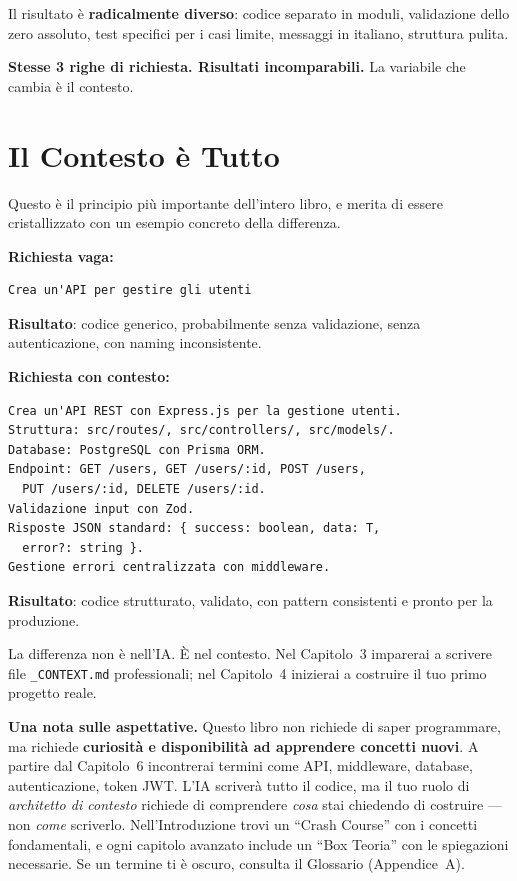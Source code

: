 Il risultato è \textbf{radicalmente diverso}: codice separato in moduli, validazione dello zero assoluto, test specifici per i casi limite, messaggi in italiano, struttura pulita.

\textbf{Stesse 3 righe di richiesta. Risultati incomparabili.} La variabile che cambia è il contesto.

\section{Il Contesto è Tutto}

Questo è il principio più importante dell'intero libro, e merita di essere cristallizzato con un esempio concreto della differenza.

\textbf{Richiesta vaga:}
\begin{lstlisting}
Crea un'API per gestire gli utenti
\end{lstlisting}
\textbf{Risultato}: codice generico, probabilmente senza validazione, senza autenticazione, con naming inconsistente.

\textbf{Richiesta con contesto:}
\begin{lstlisting}
Crea un'API REST con Express.js per la gestione utenti.
Struttura: src/routes/, src/controllers/, src/models/.
Database: PostgreSQL con Prisma ORM.
Endpoint: GET /users, GET /users/:id, POST /users,
  PUT /users/:id, DELETE /users/:id.
Validazione input con Zod.
Risposte JSON standard: { success: boolean, data: T,
  error?: string }.
Gestione errori centralizzata con middleware.
\end{lstlisting}
\textbf{Risultato}: codice strutturato, validato, con pattern consistenti e pronto per la produzione.

La differenza non è nell'IA. È nel contesto. Nel Capitolo~3 imparerai a scrivere file \texttt{\_CONTEXT.md} professionali; nel Capitolo~4 inizierai a costruire il tuo primo progetto reale.

\begin{warnbox}
\textbf{Una nota sulle aspettative.} Questo libro non richiede di saper programmare, ma richiede \textbf{curiosità e disponibilità ad apprendere concetti nuovi}. A partire dal Capitolo~6 incontrerai termini come API, middleware, database, autenticazione, token JWT. L'IA scriverà tutto il codice, ma il tuo ruolo di \textit{architetto di contesto} richiede di comprendere \textit{cosa} stai chiedendo di costruire --- non \textit{come} scriverlo. Nell'Introduzione trovi un ``Crash Course'' con i concetti fondamentali, e ogni capitolo avanzato include un ``Box Teoria'' con le spiegazioni necessarie. Se un termine ti è oscuro, consulta il Glossario (Appendice~A).
\end{warnbox}

